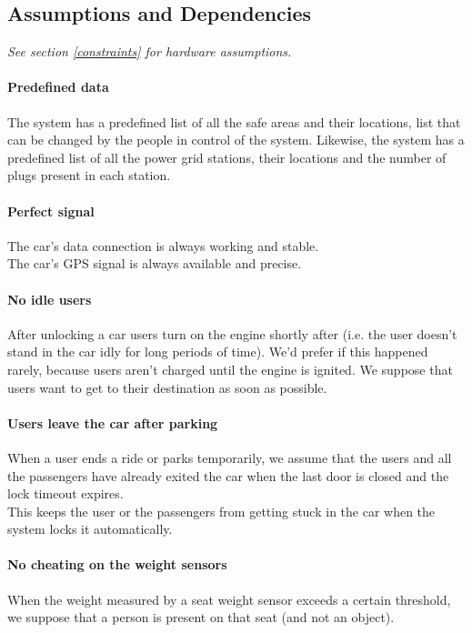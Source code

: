 \documentclass[english]{article}
\begin{document}
\newpage
\subsection{Assumptions and Dependencies}

\emph{See section \ref{constraints} for hardware assumptions.}

\paragraph{Predefined data}
The system has a predefined list of all the safe areas and their locations, list that can be changed by the people in control of the system. Likewise, the system has a predefined list of all the power grid stations, their locations and the number of plugs present in each station.

\paragraph{Perfect signal}
The car’s data connection is always working and stable. \\
The car’s GPS signal is always available and precise.

\paragraph{No idle users}
After unlocking a car users turn on the engine shortly after (i.e. the user doesn't stand in the car idly for long periods of time). We'd prefer if this happened rarely, because users aren't charged until the engine is ignited.
We suppose that users want to get to their destination as soon as possible. 

\paragraph{Users leave the car after parking}
When a user ends a ride or parks temporarily, we assume that the users and all the passengers have already exited the car when the last door is closed and the lock timeout expires. \\
This keeps the user or the passengers from getting stuck in the car when the system locks it automatically.

\paragraph{No cheating on the weight sensors}
When the weight measured by a seat weight sensor exceeds a certain threshold, we suppose that a person is present on that seat (and not an object).
\end{document}
